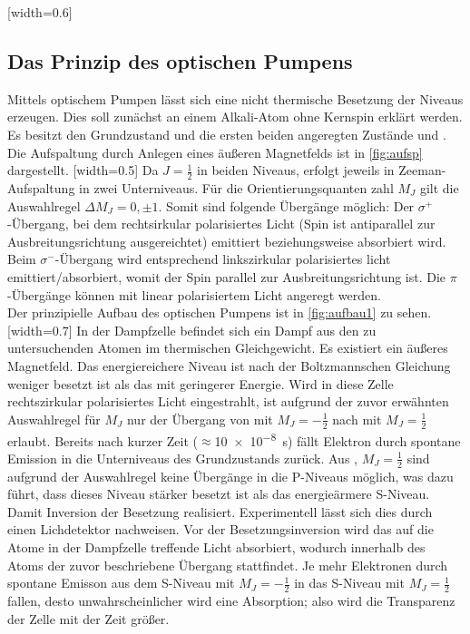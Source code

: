 [width=0.6\textwidth]

\subsection{Das Prinzip des optischen Pumpens}
Mittels optischem Pumpen lässt sich eine nicht thermische Besetzung der Niveaus erzeugen. Dies soll zunächst an einem Alkali-Atom ohne Kernspin erklärt werden. Es besitzt den Grundzustand  und die ersten beiden angeregten Zustände  und . Die Aufspaltung durch Anlegen eines äußeren Magnetfelds ist in \autoref{fig:aufsp} dargestellt.
[width=0.5\textwidth]
Da $J=\frac{1}{2}$ in beiden Niveaus, erfolgt jeweils in Zeeman-Aufspaltung in zwei Unterniveaus. Für die Orientierungsquanten zahl $M_J$ gilt die Auswahlregel $\Delta M_J = 0,\pm1$. Somit sind folgende Übergänge möglich: Der $\sigma^+$-Übergang, bei dem rechtsirkular polarisiertes Licht (Spin ist antiparallel zur Ausbreitungsrichtung ausgereichtet) emittiert beziehungsweise absorbiert wird. Beim $\sigma^-$-Übergang wird entsprechend linkszirkular polarisiertes licht emittiert/absorbiert, womit der Spin parallel zur Ausbreitungsrichtung ist. Die $\pi$-Übergänge können mit linear polarisiertem Licht angeregt werden.\\
Der prinzipielle Aufbau des optischen Pumpens ist in \autoref{fig:aufbau1} zu sehen.
[width=0.7\textwidth]
In der Dampfzelle befindet sich ein Dampf aus den zu untersuchenden Atomen im thermischen Gleichgewicht. Es existiert ein äußeres Magnetfeld. Das energiereichere Niveau ist nach der Boltzmannschen Gleichung weniger besetzt ist als das mit geringerer Energie. Wird in diese Zelle rechtszirkular polarisiertes Licht eingestrahlt, ist aufgrund der zuvor erwähnten Auswahlregel für $M_J$ nur der Übergang von  mit $M_J=-\frac{1}{2}$ nach  mit $M_J=\frac{1}{2}$ erlaubt. Bereits nach kurzer Zeit ($\approx$\SI{10e-8}{\second}) fällt Elektron durch spontane Emission in die Unterniveaus des Grundzustands zurück. Aus , $M_J= \frac{1}{2}$ sind aufgrund der Auswahlregel keine Übergänge in die P-Niveaus möglich, was dazu führt, dass dieses Niveau stärker besetzt ist als das energieärmere S-Niveau. Damit Inversion der Besetzung realisiert. Experimentell lässt sich dies durch einen Lichdetektor nachweisen. Vor der Besetzungsinversion wird das auf die  Atome in der Dampfzelle  treffende Licht absorbiert, wodurch innerhalb des Atoms der zuvor beschriebene Übergang stattfindet. Je mehr Elektronen durch spontane Emisson aus dem S-Niveau mit $M_J=-\frac{1}{2}$ in das S-Niveau mit $M_J = \frac{1}{2}$ fallen, desto unwahrscheinlicher wird eine Absorption; also wird die Transparenz der Zelle mit der Zeit größer.

